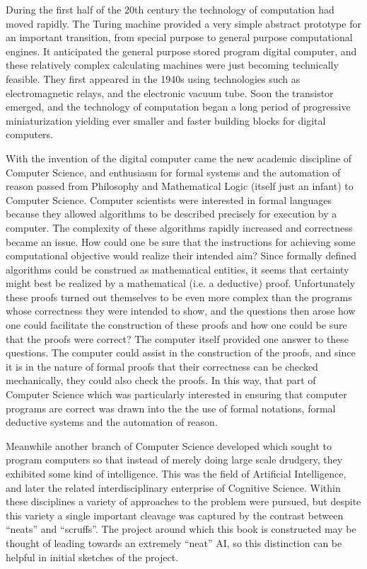 During the first half of the 20th century the technology of
computation had  moved rapidly.
The Turing machine provided a very simple abstract prototype for an
important transition, from special purpose to general purpose
computational engines.
It anticipated the general purpose stored program digital computer,
and these relatively complex calculating machines were just becoming
technically feasible.
They first appeared in the 1940s using technologies such as
electromagnetic relays, and the electronic vacuum tube.
Soon the transistor emerged, and the technology of computation began a
long period of progressive miniaturization yielding ever smaller and
faster building blocks for digital computers.

With the invention of the digital computer came the new academic
discipline of Computer Science, and enthusiasm for formal systems and
the automation of reason passed from Philosophy and Mathematical Logic
(itself just an infant) to Computer Science.
Computer scientists were interested in formal languages because they
allowed algorithms to be described precisely for execution by a computer.
The complexity of these algorithms rapidly increased and correctness
became an issue.
How could one be sure that the instructions for achieving some
computational objective would realize their intended aim?
Since formally defined algorithms could be construed as mathematical
entities, it seems that certainty might best be realized by a
mathematical (i.e. a deductive) proof.
Unfortunately these proofs turned out themselves to be even more
complex than the programs whose correctness they were intended to
show, and the questions then arose how one could facilitate the
construction of these proofs and how one could be sure that the proofs
were correct?
The computer itself provided one answer to these questions.
The computer could assist in the construction of the proofs, and since
it is in the nature of formal proofs that their correctness can be
checked mechanically, they could also check the proofs.
In this way, that part of Computer Science which was particularly
interested in ensuring that computer programs are correct was drawn
into the the use of formal notations, formal deductive systems and the
automation of reason.

Meanwhile another branch of Computer Science developed which sought to
program computers so that instead of merely doing large scale
drudgery, they exhibited some kind of intelligence.
This was the field of Artificial Intelligence, and later the related
interdisciplinary enterprise of Cognitive Science.
Within these disciplines a variety of approaches to the problem were
pursued, but despite this variety a single important cleavage was
captured by the contrast between ``neats'' and ``scruffs''.
The project around which this book is constructed may be thought of
leading towards an extremely ``neat'' AI, so this distinction can be
helpful in initial sketches of the project.

